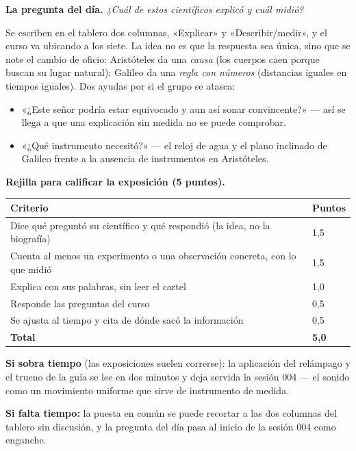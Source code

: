 \documentclass[11pt]{article}
\begin{document}
\textbf{La pregunta del día.} \emph{¿Cuál de estos científicos explicó y cuál midió?}

Se escriben en el tablero dos columnas, «Explicar» y «Describir/medir», y el curso va
ubicando a los siete. La idea no es que la respuesta sea única, sino que se note el cambio de
oficio: Aristóteles da una \emph{causa} (los cuerpos caen porque buscan su lugar natural);
Galileo da una \emph{regla con números} (distancias iguales en tiempos iguales). Dos ayudas
por si el grupo se atasca:

\begin{itemize}
  \item «¿Este señor podría estar equivocado y aun así sonar convincente?» — así se llega a
        que una explicación sin medida no se puede comprobar.
  \item «¿Qué instrumento necesitó?» — el reloj de agua y el plano inclinado de Galileo
        frente a la ausencia de instrumentos en Aristóteles.
\end{itemize}

\textbf{Rejilla para calificar la exposición (5 puntos).}

\begin{center}
{\renewcommand{\arraystretch}{1.3}
\begin{tabularx}{\linewidth}{@{}X l@{}}
  \toprule
  \textbf{Criterio} & \textbf{Puntos}\\
  \midrule
  Dice qué preguntó su científico y qué respondió (la idea, no la biografía) & 1,5\\
  Cuenta al menos un experimento o una observación concreta, con lo que midió & 1,5\\
  Explica con sus palabras, sin leer el cartel & 1,0\\
  Responde las preguntas del curso & 0,5\\
  Se ajusta al tiempo y cita de dónde sacó la información & 0,5\\
  \midrule
  \textbf{Total} & \textbf{5,0}\\
  \bottomrule
\end{tabularx}}
\end{center}

\begin{nota}
\textbf{Si sobra tiempo} (las exposiciones suelen correrse): la aplicación del relámpago y el
trueno de la guía se lee en dos minutos y deja servida la sesión 004 — el sonido como un
movimiento uniforme que sirve de instrumento de medida.

\textbf{Si falta tiempo:} la puesta en común se puede recortar a las dos columnas del tablero
sin discusión, y la pregunta del día pasa al inicio de la sesión 004 como enganche.
\end{nota}
\end{document}
